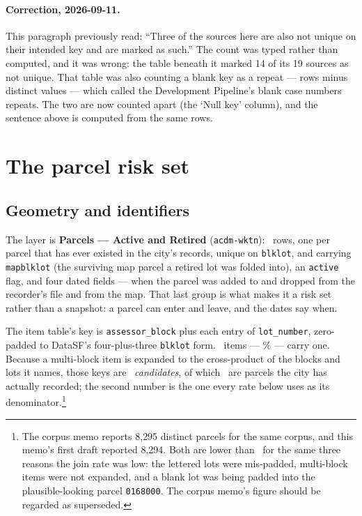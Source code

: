 \documentclass[11pt]{article}
\begin{document}
\paragraph{Correction, 2026-09-11.} This paragraph previously read: ``Three of the sources here
are also not unique on their intended key and are marked as such.'' The count was typed rather
than computed, and it was wrong: the table beneath it marked 14 of its 19 sources as not
unique. That table was also counting a blank key as a repeat --- rows minus distinct values
--- which called the Development Pipeline's blank case numbers repeats. The two are now counted
apart (the `Null key' column), and the sentence above is computed from the same rows.

\section{The parcel risk set}
\label{sec:riskset}

\subsection{Geometry and identifiers}

The layer is \textbf{Parcels --- Active and Retired} (\texttt{acdm-wktn}): \acqParcelRows\
rows, one per parcel that has ever existed in the city's records, unique on \texttt{blklot},
and carrying \texttt{mapblklot} (the surviving map parcel a retired lot was folded into),
an \texttt{active} flag, and four dated fields --- when the parcel was added to and dropped
from the recorder's file and from the map. That last group is what makes it a risk set rather
than a snapshot: a parcel can enter and leave, and the dates say when.

The item table's key is \texttt{assessor\_block} plus each entry of \texttt{lot\_number},
zero-padded to DataSF's four-plus-three \texttt{blklot} form. \acqWithParcel\ items ---
\acqParcelShare\% --- carry one. Because a multi-block item is expanded to the cross-product of
the blocks and lots it names, those keys are \acqDistinctCandidateKeys\ \emph{candidates}, of
which \acqDistinctParcelKeys\ are parcels the city has actually recorded; the second number is
the one every rate below uses as its denominator.\footnote{%
The corpus memo reports 8{,}295 distinct parcels for the same corpus, and this memo's first
draft reported 8{,}294. Both are lower than \acqDistinctParcelKeys\ for the same three reasons
the join rate was low: the lettered lots were mis-padded, multi-block items were not expanded,
and a blank lot was being padded into the plausible-looking parcel \texttt{0168000}. The corpus
memo's figure should be regarded as superseded.}
\end{document}
